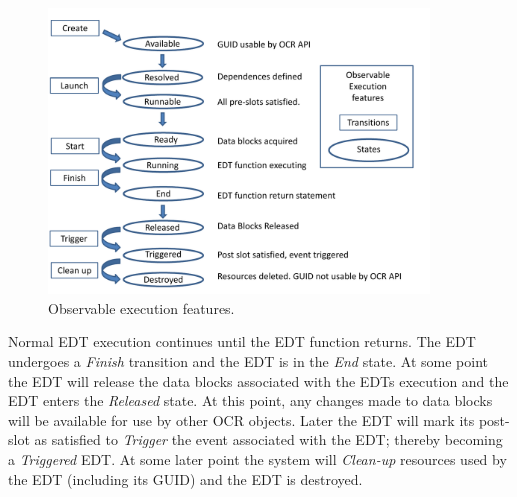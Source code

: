 %
%

\begin{figure}
\centering
 \includegraphics[width=0.9\textwidth]{EDT_exec}
\caption{Observable execution features.}
\label{fig:EDTexec}
\end{figure}

Normal EDT execution continues until the EDT function returns. The EDT undergoes
a \emph{Finish} transition and the EDT is in
the \emph{End} state. At some point the EDT will
release the data blocks associated with the EDTs execution and the
EDT enters the \emph{Released} state.
At this point, any changes made to data blocks will
be available for use by other OCR objects. Later the EDT will
mark its post-slot as satisfied to \emph{Trigger} the event
associated with the EDT; thereby becoming a \emph{Triggered} EDT. At
some later point the
system will \emph{Clean-up} resources
used by the EDT (including its GUID) and the EDT is destroyed.


